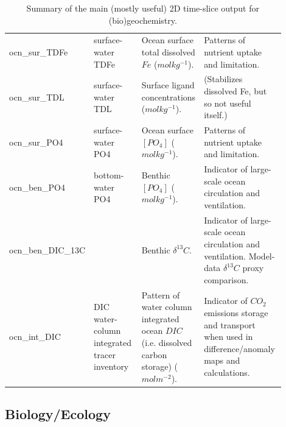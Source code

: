 \documentclass[11pt,fleqn]{book} %
\begin{document}
\begin{table}[ht]
\begin{tabular}{p{0.15\linewidth} p{0.20\linewidth} p{0.225\linewidth} p{0.325\linewidth}}
\textsf{\footnotesize ocn\_sur\_TDFe} & \textsf{\footnotesize surface-water TDFe} & \small{Ocean surface total dissolved \(Fe\) (\(molkg^{-1}\)).} & \small{Patterns of nutrient uptake and limitation.}\\
\textsf{\footnotesize ocn\_sur\_TDL} & \textsf{\footnotesize surface-water TDL} & \small{Surface   ligand concentrations (\(molkg^{-1}\)).} & \small{(Stabilizes dissolved Fe, but so not useful itself.)}\\
\textsf{\footnotesize ocn\_sur\_PO4} & \textsf{\footnotesize surface-water PO4} & \small{Ocean surface \([PO_{4}]\) (\(molkg^{-1}\)).} & \small{Patterns of nutrient uptake and limitation.}\\
\textsf{\footnotesize ocn\_ben\_PO4} & \textsf{\footnotesize bottom-water PO4} & \small{Benthic \([PO_{4}]\) (\(molkg^{-1}\)).} & \small{Indicator of large-scale ocean circulation and ventilation.}\\
\textsf{\footnotesize ocn\_ben\_DIC\_13C} & \textsf{\footnotesize } & \small{Benthic \(\delta^{13}C\).} & \small{Indicator of large-scale ocean circulation and ventilation. Model-data \(\delta^{13}C\) proxy comparison.}\\
\textsf{\footnotesize ocn\_int\_DIC} & \textsf{\footnotesize DIC water-column integrated tracer inventory} & \small{Pattern of water column integrated ocean \(DIC\) (i.e. dissolved carbon storage) (\(molm^{-2}\)).} & \small{Indicator of \(CO_{2}\) emissions storage and transport when used in difference/anomaly maps and calculations.}\\

\bottomrule
\end{tabular}
\caption{Summary of the main (mostly useful) 2D time-slice output for (bio)geochemistry.}
\end{table}



\clearpage
\subsection{Biology/Ecology}



\cleardoublepage

\end{document}
